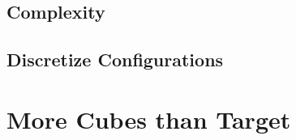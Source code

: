 

\subsection{Complexity}


\subsection{Discretize Configurations}





\section{More Cubes than Target}
\label{sec:more_cubes}


